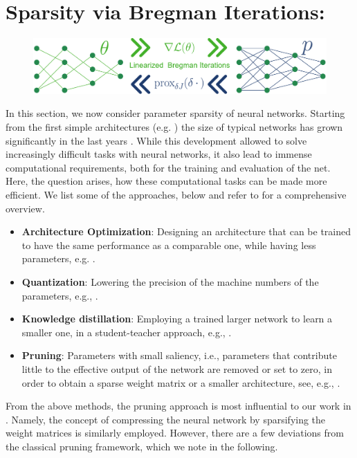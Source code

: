 \section{Sparsity via Bregman Iterations: \cite{bungert2022bregman}}\label{sec:BREG}
%
\begin{figure}
\centering
\includegraphics[width=.5\textwidth]{atelier/Breg_dist/BregmanPosterCartoon.pdf}
\end{figure}
%
%
In this section, we now consider parameter sparsity of neural networks. Starting from the first simple architectures (e.g. \cite{rosenblatt1958perceptron}) the size of typical networks has grown significantly in the last years \cite{hoefler2021sparsity}. While this development allowed to solve increasingly difficult tasks with neural networks, it also lead to immense computational requirements, both for the training and evaluation of the net. Here, the question arises, how these computational tasks can be made more efficient. We list some of the approaches, below and refer to \cite{gholami2021survey} for a comprehensive overview.
%
\begin{itemize}
\item \textbf{Architecture Optimization}: Designing an architecture that can be trained to have the same performance as a comparable one, while having less parameters, e.g. \cite{elsken2019neural, howard2017mobilenets}.
%
\item \textbf{Quantization}: Lowering the precision of the machine numbers of the parameters, e.g., \cite{banner2018scalable, courbariaux2014training}.
%
\item \textbf{Knowledge distillation}: Employing a trained larger network to learn a smaller one, in a student-teacher approach, e.g., \cite{schmidhuber1992learning, hinton2015distilling}.
%
\item \textbf{Pruning}: Parameters with small saliency, i.e., parameters that contribute little to the effective output of the network are removed or set to zero, in order to obtain a sparse weight matrix or a smaller architecture, see, e.g., \cite{lecun1989optimal, hassibi1993optimal}.
\end{itemize}
%
%
From the above methods, the pruning approach is most influential to our work in \cite{bungert2022bregman}. Namely, the concept of compressing the neural network by sparsifying the weight matrices is similarly employed. However, there are a few deviations from the classical pruning framework, which we note in the following.

